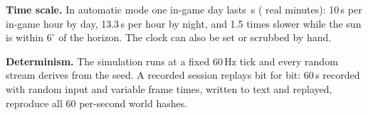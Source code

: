 \textbf{Time scale.} In automatic mode one in-game day lasts \daySeconds{}\,s (\dayMinutes{} real minutes): 10\,s per
in-game hour by day, 13.3\,s per hour by night, and 1.5 times slower while the sun is within $6^\circ$ of the horizon. The clock can also be set or scrubbed by hand.

\textbf{Determinism.} The simulation runs at a fixed 60\,Hz tick and every random stream derives from the seed. A
recorded session replays bit for bit: 60\,s recorded with random input and variable frame times, written to text and
replayed, reproduce all 60 per-second world hashes.
